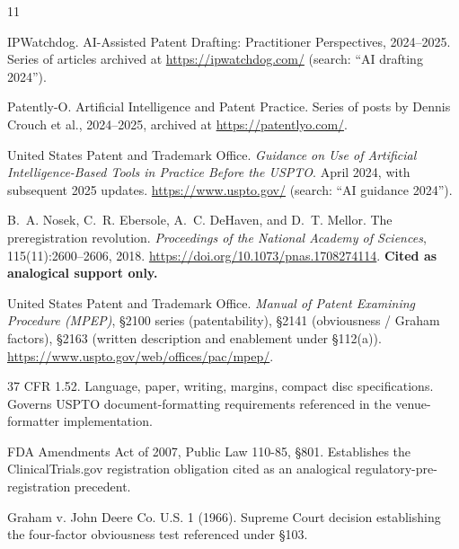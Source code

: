 \documentclass[11pt,letterpaper]{article}
\begin{document}

\begin{thebibliography}{11}

IPWatchdog.
\newblock AI-Assisted Patent Drafting: Practitioner Perspectives,
  2024--2025.
\newblock Series of articles archived at \url{https://ipwatchdog.com/}
  (search: ``AI drafting 2024'').

Patently-O.
\newblock Artificial Intelligence and Patent Practice.
\newblock Series of posts by Dennis Crouch et al., 2024--2025,
  archived at \url{https://patentlyo.com/}.

United States Patent and Trademark Office.
\newblock \emph{Guidance on Use of Artificial Intelligence-Based Tools
  in Practice Before the USPTO}.
\newblock April 2024, with subsequent 2025 updates.
\newblock \url{https://www.uspto.gov/} (search: ``AI guidance 2024'').

B.~A. Nosek, C.~R. Ebersole, A.~C. DeHaven, and D.~T. Mellor.
\newblock The preregistration revolution.
\newblock \emph{Proceedings of the National Academy of Sciences},
  115(11):2600--2606, 2018.
\newblock \url{https://doi.org/10.1073/pnas.1708274114}.
\newblock \textbf{Cited as analogical support only.}

United States Patent and Trademark Office.
\newblock \emph{Manual of Patent Examining Procedure (MPEP)},
  \S2100 series (patentability), \S2141 (obviousness / Graham
  factors), \S2163 (written description and enablement under
  \S112(a)).
\newblock \url{https://www.uspto.gov/web/offices/pac/mpep/}.

37 CFR 1.52.
\newblock Language, paper, writing, margins, compact disc
  specifications.
\newblock Governs USPTO document-formatting requirements referenced
  in the venue-formatter implementation.

FDA Amendments Act of 2007, Public Law 110-85, \S801.
\newblock Establishes the ClinicalTrials.gov registration obligation
  cited as an analogical regulatory-pre-registration precedent.

Graham v. John Deere Co.
 U.S. 1 (1966).
\newblock Supreme Court decision establishing the four-factor
  obviousness test referenced under \S103.


\end{thebibliography}
\end{document}
